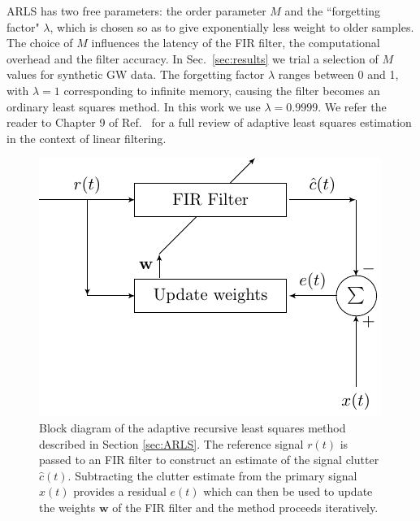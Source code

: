 \documentclass[pra,superscriptaddress,reprint,amsmath,amssymb,nofootinbib]{revtex4-2}
\begin{document}
ARLS has two free parameters: the order parameter $M$ and the ``forgetting factor" $\lambda$, which is chosen so as to give exponentially less weight to older samples. The choice of $M$ influences the latency of the FIR filter, the computational overhead and the filter accuracy. In Sec.~\ref{sec:results} we trial a selection of $M$ values for synthetic GW data. The forgetting factor $\lambda$ ranges between 0 and 1, with $\lambda=1$ corresponding to infinite memory, causing the filter becomes an ordinary least squares method. In this work we use $\lambda=0.9999$. We refer the reader to Chapter 9 of Ref.~\cite{HaykinAdaptiveFT:2002} for a full review of adaptive least squares estimation in the context of linear filtering. 
\begin{figure}
	\begin{center}
		\includegraphics[width=\columnwidth]{images/FIR_block.pdf}
	\end{center}
	\caption{Block diagram of the adaptive recursive least squares method described in Section \ref{sec:ARLS}. The reference signal $r(t)$ is passed to an FIR filter to construct an estimate of the signal clutter $\hat{c}(t)$. Subtracting the clutter estimate from the primary signal $x(t)$ provides a residual $e(t)$ which can then be used to update the weights $\mathbf{w}$ of the FIR filter and the method proceeds iteratively.}
	\label{fig:arlsBlock}
\end{figure}
\end{document}
